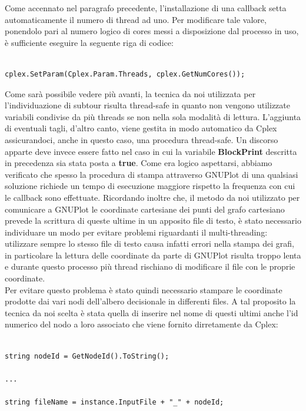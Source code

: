 \documentclass[11pt]{article}
\begin{document}
Come accennato nel paragrafo precedente, l'installazione di una callback setta automaticamente il numero di thread ad uno. Per modificare tale valore, ponendolo pari al numero logico di cores messi a disposizione dal processo in uso, è sufficiente eseguire la seguente riga di codice:

\begin{lstlisting}

cplex.SetParam(Cplex.Param.Threads, cplex.GetNumCores());

\end{lstlisting}

Come sarà possibile vedere più avanti, la tecnica da noi utilizzata per l'individuazione di subtour risulta thread-safe in quanto non vengono utilizzate variabili condivise da più threads se non nella sola modalità di lettura. L'aggiunta di eventuali tagli, d'altro canto, viene gestita in modo automatico da Cplex assicurandoci, anche in questo caso, una procedura thread-safe. Un discorso apparte deve invece essere fatto nel caso in cui la variabile \textbf{BlockPrint} descritta in precedenza sia stata posta a \textbf{true}. Come era logico aspettarsi, abbiamo verificato che spesso la procedura di stampa attraverso GNUPlot di una qualsiasi soluzione richiede un tempo di esecuzione maggiore rispetto la frequenza con cui le callback sono effettuate. Ricordando inoltre che, il metodo da noi utilizzato per comunicare a GNUPlot le coordinate cartesiane dei punti del grafo cartesiano prevede la scrittura di queste ultime in un apposito file di testo, è stato necessario individuare un modo per evitare problemi riguardanti il multi-threading: utilizzare sempre lo stesso file di testo causa infatti errori nella stampa dei grafi, in particolare la lettura delle coordinate da parte di GNUPlot risulta troppo lenta e durante questo processo più thread rischiano di modificare il file con le proprie coordinate.\\
Per evitare questo problema è stato quindi necessario stampare le coordinate prodotte dai vari nodi dell'albero decisionale in differenti files. A tal proposito la tecnica da noi scelta è stata quella di inserire nel nome di questi ultimi anche l'id numerico del nodo a loro associato che viene fornito dirretamente da Cplex:


\begin{lstlisting}

string nodeId = GetNodeId().ToString();

...

string fileName = instance.InputFile + "_" + nodeId;

\end{lstlisting}
\end{document}
